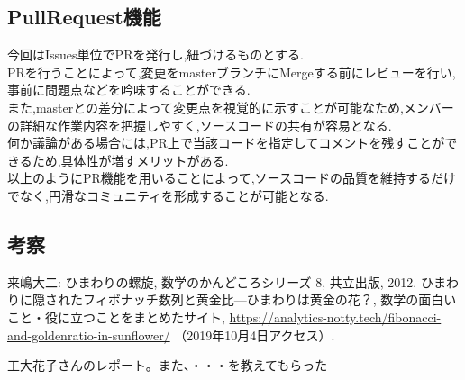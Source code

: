 \documentclass[uplatex,12pt]{jsarticle}
\begin{document}
\newpage

\subsection{PullRequest機能}
今回はIssues単位でPRを発行し,紐づけるものとする. \\
PRを行うことによって,変更をmasterブランチにMergeする前にレビューを行い,事前に問題点などを吟味することができる. \\
また,masterとの差分によって変更点を視覚的に示すことが可能なため,メンバーの詳細な作業内容を把握しやすく,ソースコードの共有が容易となる. \\
何か議論がある場合には,PR上で当該コードを指定してコメントを残すことができるため,具体性が増すメリットがある. \\
以上のようにPR機能を用いることによって,ソースコードの品質を維持するだけでなく,円滑なコミュニティを形成することが可能となる.

\subsection{考察}



\begin{thebibliography}{99}
 来嶋大二: ひまわりの螺旋, 数学のかんどころシリーズ 8, 共立出版, 2012.
 ひまわりに隠されたフィボナッチ数列と黄金比---ひまわりは黄金の花？, 数学の面白いこと・役に立つことをまとめたサイト, \url{https://analytics-notty.tech/fibonacci-and-goldenratio-in-sunflower/} （2019年10月4日アクセス）.

 工大花子さんのレポート。また、・・・を教えてもらった 

\end{thebibliography}
\end{document}
